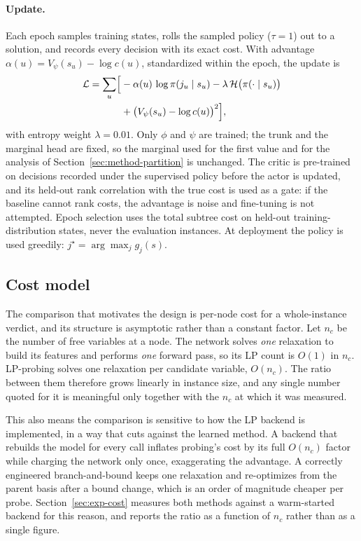 \documentclass[final,5p,times,twocolumn]{elsarticle}
\begin{document}
\paragraph{Update.} Each epoch samples training states, rolls the sampled policy ($\tau=1$) out to a solution, and records every decision with its exact cost. With advantage $\alpha(u)=V_\psi(s_u)-\log c(u)$, standardized within the epoch, the update is
\begin{equation}
\begin{split}
\mathcal{L} = \sum_u \Bigl[&-\alpha(u)\,\log\pi(j_u\mid s_u) - \lambda\,\mathcal{H}\bigl(\pi(\cdot\mid s_u)\bigr)\\
&+ \bigl(V_\psi(s_u)-\log c(u)\bigr)^2\Bigr],
\end{split}
\end{equation}
with entropy weight $\lambda=0.01$. Only $\phi$ and $\psi$ are trained; the trunk and the marginal head are fixed, so the marginal used for the first value and for the analysis of Section~\ref{sec:method-partition} is unchanged. The critic is pre-trained on decisions recorded under the supervised policy before the actor is updated, and its held-out rank correlation with the true cost is used as a gate: if the baseline cannot rank costs, the advantage is noise and fine-tuning is not attempted. Epoch selection uses the total subtree cost on held-out training-distribution states, never the evaluation instances. At deployment the policy is used greedily: $j^\star=\arg\max_j g_j(s)$.

\subsection{Cost model}
\label{sec:method-cost}

The comparison that motivates the design is per-node cost for a whole-instance verdict, and its structure is asymptotic rather than a constant factor. Let $n_c$ be the number of free variables at a node. The network solves \emph{one} relaxation to build its features and performs \emph{one} forward pass, so its LP count is $O(1)$ in $n_c$. LP-probing solves one relaxation per candidate variable, $O(n_c)$. The ratio between them therefore grows linearly in instance size, and any single number quoted for it is meaningful only together with the $n_c$ at which it was measured.

This also means the comparison is sensitive to how the LP backend is implemented, in a way that cuts against the learned method. A backend that rebuilds the model for every call inflates probing's cost by its full $O(n_c)$ factor while charging the network only once, exaggerating the advantage. A correctly engineered branch-and-bound keeps one relaxation and re-optimizes from the parent basis after a bound change, which is an order of magnitude cheaper per probe. Section~\ref{sec:exp-cost} measures both methods against a warm-started backend for this reason, and reports the ratio as a function of $n_c$ rather than as a single figure.
\end{document}
